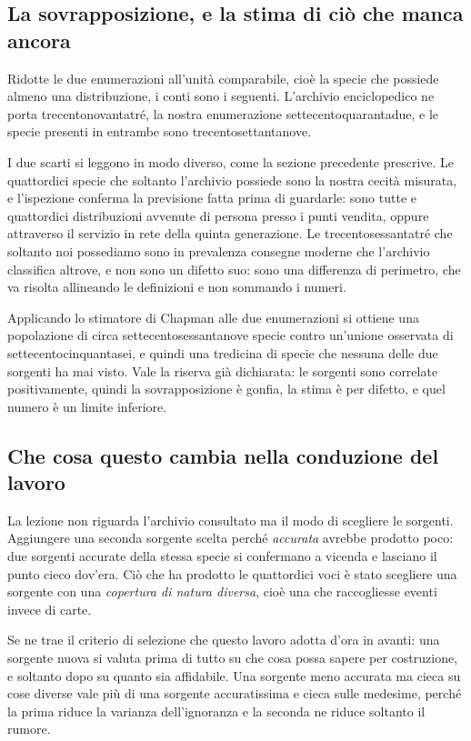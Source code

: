 \subsection{La sovrapposizione, e la stima di ciò che manca ancora}

Ridotte le due enumerazioni all'unità comparabile, cioè la specie che possiede almeno una distribuzione, i conti sono i seguenti. L'archivio enciclopedico ne porta trecentonovantatré, la nostra enumerazione settecentoquarantadue, e le specie presenti in entrambe sono trecentosettantanove.

I due scarti si leggono in modo diverso, come la sezione precedente prescrive. Le quattordici specie che soltanto l'archivio possiede sono la nostra cecità misurata, e l'ispezione conferma la previsione fatta prima di guardarle: sono tutte e quattordici distribuzioni avvenute di persona presso i punti vendita, oppure attraverso il servizio in rete della quinta generazione. Le trecentosessantatré che soltanto noi possediamo sono in prevalenza consegne moderne che l'archivio classifica altrove, e non sono un difetto suo: sono una differenza di perimetro, che va risolta allineando le definizioni e non sommando i numeri.

Applicando lo stimatore di Chapman alle due enumerazioni si ottiene una popolazione di circa settecentosessantanove specie contro un'unione osservata di settecentocinquantasei, e quindi una tredicina di specie che nessuna delle due sorgenti ha mai visto. Vale la riserva già dichiarata: le sorgenti sono correlate positivamente, quindi la sovrapposizione è gonfia, la stima è per difetto, e quel numero è un limite inferiore.

\subsection{Che cosa questo cambia nella conduzione del lavoro}

La lezione non riguarda l'archivio consultato ma il modo di scegliere le sorgenti. Aggiungere una seconda sorgente scelta perché \emph{accurata} avrebbe prodotto poco: due sorgenti accurate della stessa specie si confermano a vicenda e lasciano il punto cieco dov'era. Ciò che ha prodotto le quattordici voci è stato scegliere una sorgente con una \emph{copertura di natura diversa}, cioè una che raccogliesse eventi invece di carte.

Se ne trae il criterio di selezione che questo lavoro adotta d'ora in avanti: una sorgente nuova si valuta prima di tutto su che cosa possa sapere per costruzione, e soltanto dopo su quanto sia affidabile. Una sorgente meno accurata ma cieca su cose diverse vale più di una sorgente accuratissima e cieca sulle medesime, perché la prima riduce la varianza dell'ignoranza e la seconda ne riduce soltanto il rumore.
